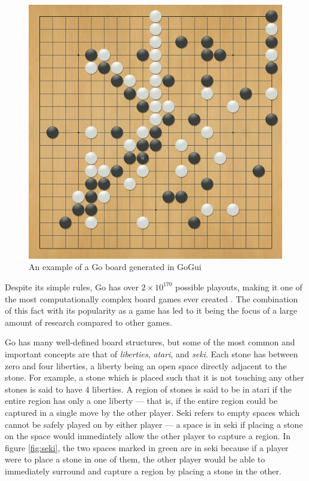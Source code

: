 \begin{figure}[h]
\centering
\includegraphics[scale=0.25]{images/gogui.png}
\caption{An example of a Go board generated in GoGui \cite{fuego}}
\label{ref:gogui}
\end{figure}

Despite its simple rules, Go has over $2 \times 10^{170}$ possible playouts, making it one of the most computationally complex board games ever created \cite{Trompfinal}.  The combination of this fact with its popularity as a game has led to it being the focus of a large amount of research compared to other games.

Go has many well-defined board structures, but some of the most common and important concepts are that of \textit{liberties}, \textit{atari}, and \textit{seki}.  Each stone has between zero and four liberties, a liberty being an open space directly adjacent to the stone.  For example, a stone which is placed such that it is not touching any other stones is said to have 4 liberties.  A region of stones is said to be in atari if the entire region has only a one liberty --- that is, if the entire region could be captured in a single move by the other player.  Seki refers to empty spaces which cannot be safely played on by either player --- a space is in seki if placing a stone on the space would immediately allow the other player to capture a region.  In figure \ref{fig:seki}, the two spaces marked in green are in seki because if a player were to place a stone in one of them, the other player would be able to immediately surround and capture a region by placing a stone in the other.

